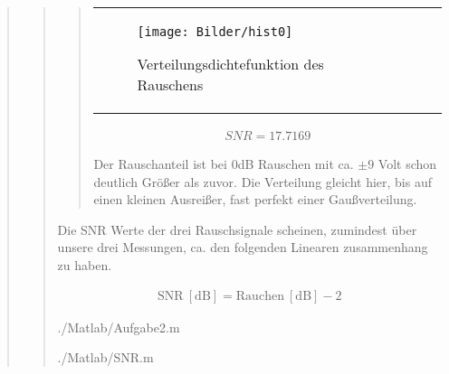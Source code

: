 \begin{quote}
\begin{quote}
\begin{quote}
\begin{center}
\begin{tabular}{ll}
\begin{minipage}{0.6\textwidth}
            \end{minipage}
        
            \begin{minipage}{0.6\textwidth}
                \begin{figure}[H]
                    \texttt{[image: Bilder/hist0]}
                    \caption{Verteilungsdichtefunktion des Rauschens}
                    \label{fig:hist0}
                \end{figure}
        
            \end{minipage}
        
        \end{tabular}
        \end{center}
            
            \vspace{2em}
            
            \begin{equation*}
            \begin{split}
                 SNR = 17.7169
            \end{split}
            \end{equation*}
            
            Der Rauschanteil ist bei 0dB Rauschen mit ca. $\pm9$ Volt schon deutlich Größer als zuvor. Die Verteilung gleicht
            hier, bis auf einen kleinen Ausreißer, fast perfekt einer Gaußverteilung.
            
        \end{quote}

            \vspace{4em}

        Die SNR Werte der drei Rauschsignale scheinen, zumindest über unsere drei Messungen, ca. den folgenden Linearen
        zusammenhang zu haben.
        
        \begin{equation*}
    	\begin{split}
    		\mathrm{SNR \ [dB]} = \mathrm{Rauchen \ [dB]} - 2 
    	\end{split}
        \end{equation*}
        
        \newpage
        
            {./Matlab/Aufgabe2.m}
        
        
            {./Matlab/SNR.m}
        
    \end{quote}
    
    
    
\end{quote}





